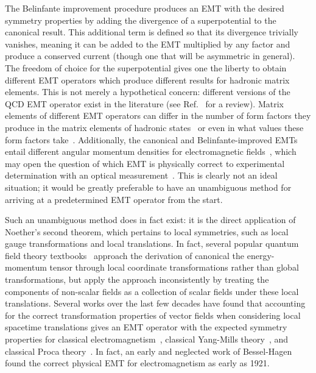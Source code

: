 \documentclass[prd,preprint,
  showpacs,showkeys,lengthcheck,
  nofootinbib,tightenlines,onecolumn,notitlepage,
  preprintnumbers,superscriptaddress]{revtex4-1}
\begin{document}
The Belinfante improvement procedure produces an EMT
with the desired symmetry properties
by adding the divergence of a superpotential to the canonical result.
This additional term is defined so that its divergence trivially vanishes,
meaning it can be added to the EMT multiplied by any factor
and produce a conserved current
(though one that will be asymmetric in general).
The freedom of choice for the superpotential
gives one the liberty to obtain different EMT operators
which produce different results for hadronic matrix elements.
This is not merely a hypothetical concern:
different versions of the QCD EMT operator exist in the literature
(see Ref.~\cite{Leader:2013jra} for a review).
Matrix elements of different EMT operators can differ in the number
of form factors they produce in the matrix elements of hadronic
states~\cite{Lorce:2018egm,Cosyn:2019aio}
or even in what values these form factors take~\cite{Hudson:2017xug}.
Additionally, the canonical and Belinfante-improved EMTs
entail different angular momentum densities for electromagnetic
fields~\cite{Jaffe:1989jz,Ji:1996ek},
which may open the question of which EMT is physically correct
to experimental determination with an optical measurement~\cite{Leader:2017htb}.
This is clearly not an ideal situation;
it would be greatly preferable to have an unambiguous method for
arriving at a predetermined EMT operator from the start.

Such an unambiguous method does in fact exist:
it is the direct application of Noether's second theorem,
which pertains to local symmetries,
such as local gauge transformations and local translations.
In fact, several popular quantum field theory
textbooks~\cite{Itzykson:1980rh,Weinberg:1995mt}
approach the derivation of canonical the energy-momentum tensor
through local coordinate transformations rather than global transformations,
but apply the approach inconsistently by
treating the components of non-scalar fields as
a collection of scalar fields under these local translations.
Several works over the last few decades have found that
accounting for the correct transformation properties of vector fields
when considering local spacetime translations
gives an EMT operator with the expected symmetry properties for classical
electromagnetism~\cite{Felsager:1981iy,Munoz:1996wp,GamboaSaravi:2002vos,Montesinos:2006th},
classical Yang-Mills theory~\cite{GamboaSaravi:2003aq,Montesinos:2006th},
and classical Proca theory~\cite{Montesinos:2006th}.
In fact, an early and neglected work of Bessel-Hagen~\cite{Bessel:1921emt}
found the correct physical EMT for electromagnetism as early as 1921.
\end{document}
